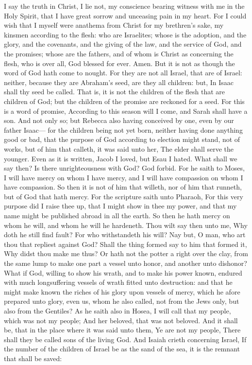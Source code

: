 I say the truth in Christ, I lie not, my conscience bearing witness with me in the Holy Spirit, that I have great sorrow and unceasing pain in my heart. For I could wish that I myself were anathema from Christ for my brethren’s sake, my kinsmen according to the flesh: who are Israelites; whose is the adoption, and the glory, and the covenants, and the giving of the law, and the service of God, and the promises; whose are the fathers, and of whom is Christ as concerning the flesh, who is over all, God blessed for ever. Amen.  But it is not as though the word of God hath come to nought. For they are not all Israel, that are of Israel: neither, because they are Abraham’s seed, are they all children: but, In Isaac shall thy seed be called. That is, it is not the children of the flesh that are children of God; but the children of the promise are reckoned for a seed. For this is a word of promise, According to this season will I come, and Sarah shall have a son. And not only so; but Rebecca also having conceived by one, even by our father Isaac— for the children being not yet born, neither having done anything good or bad, that the purpose of God according to election might stand, not of works, but of him that calleth, it was said unto her, The elder shall serve the younger. Even as it is written, Jacob I loved, but Esau I hated.  What shall we say then? Is there unrighteousness with God? God forbid. For he saith to Moses, I will have mercy on whom I have mercy, and I will have compassion on whom I have compassion. So then it is not of him that willeth, nor of him that runneth, but of God that hath mercy. For the scripture saith unto Pharaoh, For this very purpose did I raise thee up, that I might show in thee my power, and that my name might be published abroad in all the earth. So then he hath mercy on whom he will, and whom he will he hardeneth.  Thou wilt say then unto me, Why doth he still find fault? For who withstandeth his will? Nay but, O man, who art thou that repliest against God? Shall the thing formed say to him that formed it, Why didst thou make me thus? Or hath not the potter a right over the clay, from the same lump to make one part a vessel unto honor, and another unto dishonor? What if God, willing to show his wrath, and to make his power known, endured with much longsuffering vessels of wrath fitted unto destruction: and that he might make known the riches of his glory upon vessels of mercy, which he afore prepared unto glory, even us, whom he also called, not from the Jews only, but also from the Gentiles? As he saith also in Hosea, I will call that my people, which was not my people; And her beloved, that was not beloved.  And it shall be, that in the place where it was said unto them, Ye are not my people, There shall they be called sons of the living God.  And Isaiah crieth concerning Israel, If the number of the children of Israel be as the sand of the sea, it is the remnant that shall be saved: 